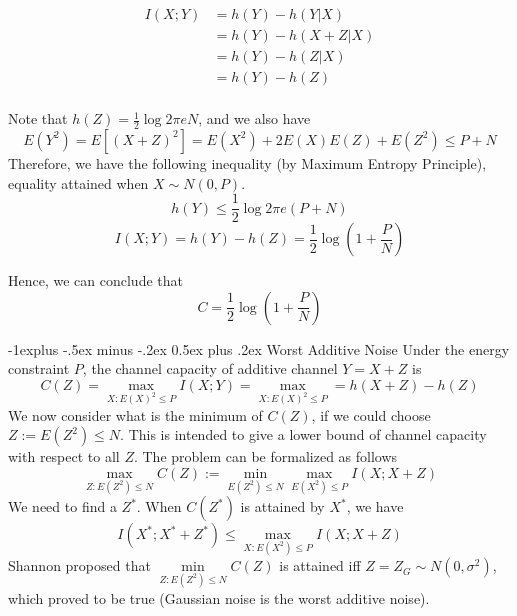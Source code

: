\documentclass[10pt,landscape, a4paper]{article}
\makeatletter
\renewcommand{\subsection}{\@startsection{subsection}{2}{0mm}%
                                {-1explus -.5ex minus -.2ex}%
                                {0.5ex plus .2ex}%
                                {\normalfont\normalsize\bfseries}}
\makeatother
\begin{document}
\begin{multicols}{3}
$$
\begin{aligned}
I(X;Y)&=h(Y)-h(Y|X)\\
&=h(Y)-h(X+Z|X)\\
&=h(Y)-h(Z|X)\\
&=h(Y)-h(Z)\\
\end{aligned}
$$

Note that $h(Z)=\frac{1}{2}\log 2\pi eN$, and we also have
$$
E(Y^2)=E[(X+Z)^2]=E(X^2)+2E(X)E(Z)+E(Z^2)\le P+N
$$
Therefore, we have the following inequality (by Maximum Entropy Principle), equality attained when $X\sim N(0,P)$.
$$
h(Y)\le \frac{1}{2}\log 2\pi e(P+N)
$$
$$
I(X;Y)=h(Y)-h(Z)=\frac{1}{2}\log\left(1+\frac{P}{N}\right)
$$

Hence, we can conclude that
$$
C=\frac{1}{2}\log\left(1+\frac{P}{N}\right)
$$

\subsection{Worst Additive Noise}
Under the energy constraint $P$, the channel capacity of additive channel $Y=X+Z$ is
$$
C(Z)=\max_{X:E(X)^2\le P} I(X;Y)=\max_{X:E(X)^2\le P}=h(X+Z)-h(Z)
$$
We now consider what is the minimum of $C(Z)$, if we could choose $Z:=E(Z^2)\le N$. This is intended to give a lower bound of channel capacity with respect to all $Z$. The problem can be formalized as follows
$$
\max_{Z:E(Z^2)\le N} C(Z):=\min_{E(Z^2)\le N}\max_{E(X^2)\le P} I(X;X+Z)
$$
We need to find a $Z^*$. When $C(Z^*)$ is attained by $X^*$, we have
$$
I(X^*;X^*+Z^*)\le \max_{X:E(X^2)\le P} I(X;X+Z)
$$
Shannon proposed that $\min\limits_{Z:E(Z^2)\le N} C(Z)$ is attained iff $Z=Z_G\sim N(0,\sigma^2)$, which proved to be true (Gaussian noise is the worst additive noise). 

\end{multicols}
\end{document}
